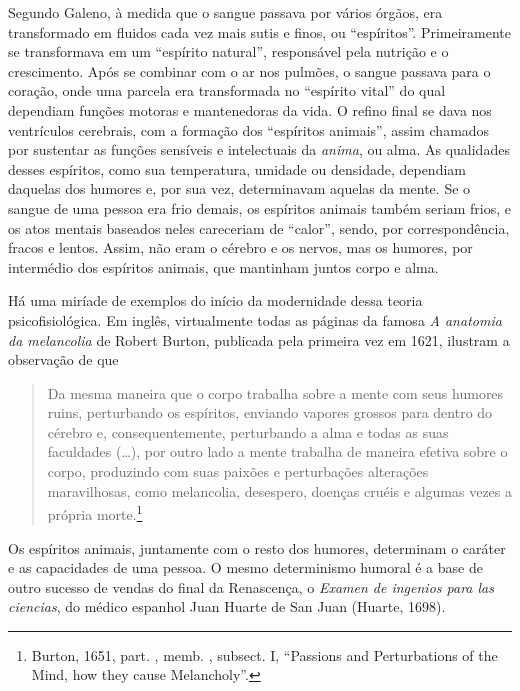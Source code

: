 Segundo Galeno, à medida que o sangue passava por vários órgãos, era
transformado em fluidos cada vez mais sutis e finos, ou ``espíritos''.
Primeiramente se transformava em um ``espírito natural'', responsável
pela nutrição e o crescimento. Após se combinar com o ar nos pulmões, o
sangue passava para o coração, onde uma parcela era transformada no
``espírito vital'' do qual dependiam funções motoras e mantenedoras da
vida. O refino final se dava nos ventrículos cerebrais, com a formação
dos ``espíritos animais'', assim chamados por sustentar as funções
sensíveis e intelectuais da \emph{anima}, ou alma. As qualidades desses
espíritos, como sua temperatura, umidade ou densidade, dependiam
daquelas dos humores e, por sua vez, determinavam aquelas da mente. Se o
sangue de uma pessoa era frio demais, os espíritos animais também seriam
frios, e os atos mentais baseados neles careceriam de ``calor'', sendo,
por correspondência, fracos e lentos. Assim, não eram o cérebro e os
nervos, mas os humores, por intermédio dos espíritos animais, que
mantinham juntos corpo e alma.

Há uma miríade de exemplos do início da modernidade dessa teoria
psicofisiológica. Em inglês, virtualmente todas as páginas da famosa
\emph{A anatomia da melancolia} de Robert Burton, publicada pela
primeira vez em 1621, ilustram a observação de que

\begin{quote}
Da mesma maneira que o corpo trabalha sobre a mente com seus humores ruins, perturbando
os espíritos, enviando vapores grossos para dentro do cérebro e,
consequentemente, perturbando a alma e todas as suas faculdades (\ldots{}),
por outro lado a mente trabalha de maneira efetiva sobre o corpo, produzindo
com suas paixões e perturbações alterações maravilhosas, como melancolia,
desespero, doenças cruéis e algumas vezes a própria
morte.\footnote[7]{Burton, 1651, part. , memb. , subsect. I, ``Passions and Perturbations of the Mind, how they cause Melancholy''.}
\end{quote}

Os espíritos animais, juntamente com o resto dos humores, determinam o
caráter e as capacidades de uma pessoa. O mesmo determinismo humoral é a
base de outro sucesso de vendas do final da Renascença, o \emph{Examen
de ingenios para las ciencias}, do médico espanhol Juan Huarte de San
Juan (Huarte, 1698).

